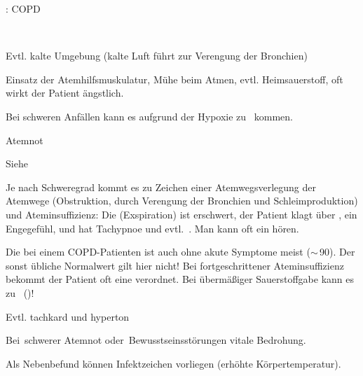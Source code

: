 {\TxABCDE: COPD}
{~
\begin{ABCDEText}
  \item[\ABCDE{1}] Evtl. kalte Umgebung (kalte Luft führt
  zur Verengung der Bronchien)
  \item[\ABCDE{2}] Einsatz der Atemhilfsmuskulatur, Mühe
  beim Atmen, evtl. Heimsauerstoff, oft wirkt der Patient
  ängstlich.
  \item[\ABCDE{3}] Bei schweren Anfällen kann es aufgrund
  der Hypoxie zu {\RedFlag}\,
  kommen.
  \item[\ABCDE{4}] Atemnot
  \item[\ABCDE{A}] Siehe 
  \item[\ABCDE{B}] Je nach Schweregrad kommt es zu Zeichen
  einer Atemwegsverlegung der 
  Atemwege  (Obstruktion, durch Verengung der Bronchien und
  Schleimproduktion) und Ateminsuffizienz:
  Die  (Exspiration) ist erschwert, der Patient klagt
  über , ein Engegefühl,  und
  hat Tachypnoe und evtl. {\RedFlag}\,. Man kann
  oft ein
  hören.
  
  Die  bei einem COPD-Patienten ist
  auch ohne akute Symptome meist 
  ($\sim$\,{90}\PC*). Der sonst übliche Normalwert
  gilt hier nicht! Bei fortgeschrittener Ateminsuffizienz
  bekommt der Patient oft eine 
  verordnet. Bei übermäßiger Sauerstoffgabe kann es zu
  {\RedFlag}\,
  ()!
  \item[\ABCDE{C}] Evtl. tachkard und hyperton
  \item[\ABCDE{=}] Bei {\RedFlag}\,schwerer Atemnot
  oder {\RedFlag}\,Bewusstseinsstörungen vitale Bedrohung.
  \item[\ABCDE{\ldots}] Als Nebenbefund können Infektzeichen
  vorliegen (erhöhte Körpertemperatur).
\end{ABCDEText}
}
